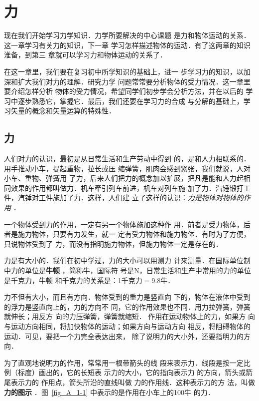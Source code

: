 \chapter{力}\label{chapter-force}

    现在我们开始学习力学知识．力学所要解决的中心课题
是力和物体运动的关系．这一章学习有关力的知识，下一章
学习怎样描述物体的运动．有了这两章的知识淮备，到第三
章就可以学习力和物体运动的关系了．

    在这一章里，我们要在复习初中所学知识的基础上，进一
步学习力的知识，以加深和扩大我们对力的理解．研究力学
问题常常要分析物体的受力情况．这一章里要介绍怎样分析
物体的受力情况，希望同学们初步学会分析方法，并在以后的
学习中逐步熟悉它，掌握它．最后，我们还要在学习力的合成
与分解的基础上，学习矢量的概念和矢量运算的特殊性．


\section{力} 
    人们对力的认识，最初是从日常生活和生产劳动中得到
的，是和人力相联系的．用手推动小车，提起重物，拉长或压
缩弹簧，肌肉会感到紧张，我们就说，人对小车、重物、弹簧用
了力，后来人们把力的概念加以扩展，把凡是能和人力起相
同效果的作用都叫做力．机车牵引列车前进，机车对列车施
加了力．汽锤锻打工件，汽锤对工件施加了力．这样，人们建
立了这样的认识：\textit{力是物体对物体的作用} ．

一个物体受到力的作用，一定有另一个物体施加这种作
用．前者是受力物体，后者是施力物体，只要有力发生，就一
定有受力物体和施力物体．有时为了方便，只说物体受到了
力，而没有指明施力物体，但施力物体一定是存在的．

    力是有大小的．我们在初中学过，力的大小可以用测力
计来测量．在国际单位制中力的单位是\textbf{牛顿} ，简称牛，国际符
号是N，日常生活和生产中常用的力的单位是千克力，牛顿
和千克力的关系是：1千克力$=9.8$牛．

    力不但有大小，而且有方向．物体受到的重力是竖直向
下的，物体在液体中受到的浮力是竖直向上的，力的方向不
同，它的作用效果也不同．用力拉弹簧，弹簧就伸长；用反方
向的力压弹簧，弹簧就缩短．
作用在运动物体上的力，如果方
向与运动方向相同，将加快物体的运动；如果方向与运动方向
相反，将阻碍物体的运动．可见，要把一个力完全表达出来，
除了说明力的大小外，还要指明力的方向．

为了直观地说明力的作用，常常用一根带箭头的线
段来表示力．线段是按一定比
例（标度）画出的，它的长短表
示力的大小，它的指向表示力
的方向，箭头或箭尾表示力的
作用点，箭头所沿的直线叫做
力的作用线．这种表示力的方
法，叫做\textbf{力的图示} ．图~\ref{fig_A_1-1} 中表示的是作用在小车上的100牛
的力．

